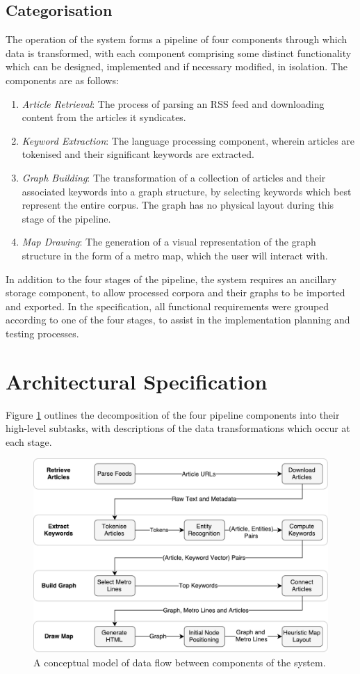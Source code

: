 \subsection{Categorisation}
The operation of the system forms a pipeline of four components through which data is transformed, with each component comprising some distinct functionality which can be designed, implemented and if necessary modified, in isolation. The components are as follows:
\begin{enumerate}[itemsep=0.1em]
	\item \textit{Article Retrieval}: The process of parsing an RSS feed and downloading content from the articles it syndicates.
	\item \textit{Keyword Extraction}: The language processing component, wherein articles are tokenised and their significant keywords are extracted.
	\item \textit{Graph Building}: The transformation of a collection of articles and their associated keywords into a graph structure, by selecting keywords which best represent the entire corpus. The graph has no physical layout during this stage of the pipeline.
	\item \textit{Map Drawing}: The generation of a visual representation of the graph structure in the form of a metro map, which the user will interact with.
\end{enumerate}
In addition to the four stages of the pipeline, the system requires an ancillary storage component, to allow processed corpora and their graphs to be imported and exported. In the specification, all functional requirements were grouped according to one of the four stages, to assist in the implementation planning and testing processes.

\section{Architectural Specification}
Figure \ref{fig:dfp} outlines the decomposition of the four pipeline components into their high-level subtasks, with descriptions of the data transformations which occur at each stage.

\begin{figure}[htbp!]
	\centering
	\includegraphics[width=\textwidth]{img/design/DataFlow.pdf}
	\caption{A conceptual model of data flow between components of the system.}
	\label{fig:dfp}
\end{figure}

